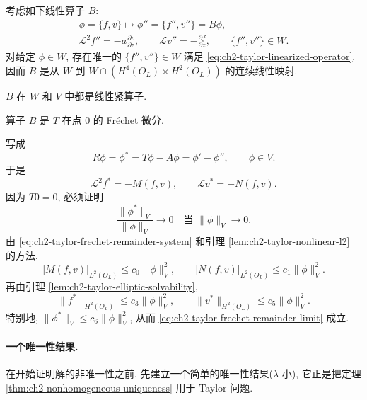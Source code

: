 考虑如下线性算子 $B$:
\begin{equation}
\begin{gathered}
\phi=\{f,v\}\longmapsto\phi''=\{f'',v''\}=B\phi,\\
\mathcal L^2f''=-a\frac{\partial v}{\partial z},
\qquad
\mathcal Lv''=-\frac{\partial f}{\partial z},
\qquad
\{f'',v''\}\in W.
\end{gathered}
\label{eq:ch2-taylor-linearized-operator}
\end{equation}
对给定 $\phi\in W$, 存在唯一的 $\{f'',v''\}\in W$ 满足 \eqref{eq:ch2-taylor-linearized-operator}. 因而 $B$ 是从 $W$ 到 $W\cap(H^4(O_L)\times H^2(O_L))$ 的连续线性映射.

\begin{Lemma}
\label{lem:ch2-taylor-linearized-compact}
$B$ 在 $W$ 和 $V$ 中都是线性紧算子.
\end{Lemma}

\begin{Lemma}
\label{lem:ch2-taylor-frechet-derivative}
算子 $B$ 是 $T$ 在点 $0$ 的 Fréchet 微分.
\end{Lemma}

\begin{Proof}
写成
\[
R\phi=\phi^*=T\phi-A\phi=\phi'-\phi'',
\qquad\phi\in V.
\]
于是
\begin{equation}
\mathcal L^2f^*=-M(f,v),
\qquad
\mathcal Lv^*=-N(f,v).
\label{eq:ch2-taylor-frechet-remainder-system}
\end{equation}
因为 $T0=0$, 必须证明
\begin{equation}
\frac{\lVert\phi^*\rVert_V}{\lVert\phi\rVert_V}\longrightarrow0
\quad\text{当 }\lVert\phi\rVert_V\to0.
\label{eq:ch2-taylor-frechet-remainder-limit}
\end{equation}
由 \eqref{eq:ch2-taylor-frechet-remainder-system} 和引理 \ref{lem:ch2-taylor-nonlinear-l2} 的方法,
\[
|M(f,v)|_{L^2(O_L)}\leq c_0\lVert\phi\rVert_V^2,
\qquad
|N(f,v)|_{L^2(O_L)}\leq c_1\lVert\phi\rVert_V^2.
\]
再由引理 \ref{lem:ch2-taylor-elliptic-solvability},
\[
\lVert f^*\rVert_{H^2(O_L)}\leq c_3\lVert\phi\rVert_V^2,
\qquad
\lVert v^*\rVert_{H^2(O_L)}\leq c_5\lVert\phi\rVert_V^2.
\]
特别地, $\lVert\phi^*\rVert_V\leq c_6\lVert\phi\rVert_V^2$, 从而 \eqref{eq:ch2-taylor-frechet-remainder-limit} 成立.
\end{Proof}

\hypertarget{chapter-02-page-172}{}
\paragraph{一个唯一性结果.}
\label{subsec:ch2-taylor-small-parameter-uniqueness}
在开始证明解的非唯一性之前, 先建立一个简单的唯一性结果($\lambda$ 小), 它正是把定理 \ref{thm:ch2-nonhomogeneous-uniqueness} 用于 Taylor 问题.

